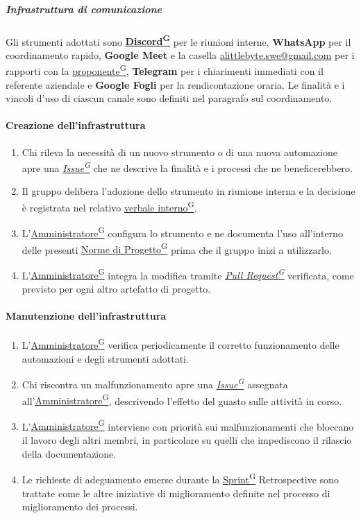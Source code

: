 \documentclass[a4paper,12pt]{article}
\providecommand{\glslink}[2]{\href{https://alittlebyte-19.github.io/Documentazione/glossario.html\#gls-#1}{\underline{#2}\textsuperscript{\scriptsize G}}}
\begin{document}
\subparagraph{Infrastruttura di comunicazione}
Gli strumenti adottati sono \textbf{\glslink{discord}{Discord}} per le riunioni interne, \textbf{WhatsApp} per il coordinamento rapido, \textbf{Google Meet} e la casella \url{alittlebyte.swe@gmail.com} per i rapporti con la \glslink{committente-proponente}{proponente}, \textbf{Telegram} per i chiarimenti immediati con il referente aziendale e \textbf{Google Fogli} per la rendicontazione oraria. Le finalità e i vincoli d'uso di ciascun canale sono definiti nel paragrafo sul coordinamento.

\paragraph{Creazione dell'infrastruttura}
\begin{enumerate}
    \item Chi rileva la necessità di un nuovo strumento o di una nuova automazione apre una \textit{\glslink{issue}{Issue}} che ne descrive la finalità e i processi che ne beneficerebbero.
    \item Il gruppo delibera l'adozione dello strumento in riunione interna e la decisione è registrata nel relativo \glslink{verbale-interno}{verbale interno}.
    \item L'\glslink{amministratore}{Amministratore} configura lo strumento e ne documenta l'uso all'interno delle presenti \glslink{norme-di-progetto}{Norme di Progetto} prima che il gruppo inizi a utilizzarlo.
    \item L'\glslink{amministratore}{Amministratore} integra la modifica tramite \textit{\glslink{pull-request}{Pull Request}} verificata, come previsto per ogni altro artefatto di progetto.
\end{enumerate}

\paragraph{Manutenzione dell'infrastruttura}
\begin{enumerate}
    \item L'\glslink{amministratore}{Amministratore} verifica periodicamente il corretto funzionamento delle automazioni e degli strumenti adottati.
    \item Chi riscontra un malfunzionamento apre una \textit{\glslink{issue}{Issue}} assegnata all'\glslink{amministratore}{Amministratore}, descrivendo l'effetto del guasto sulle attività in corso.
    \item L'\glslink{amministratore}{Amministratore} interviene con priorità sui malfunzionamenti che bloccano il lavoro degli altri membri, in particolare su quelli che impediscono il rilascio della documentazione.
    \item Le richieste di adeguamento emerse durante la \glslink{sprint}{Sprint} Retrospective sono trattate come le altre iniziative di miglioramento definite nel processo di miglioramento dei processi.
\end{enumerate}
\end{document}
